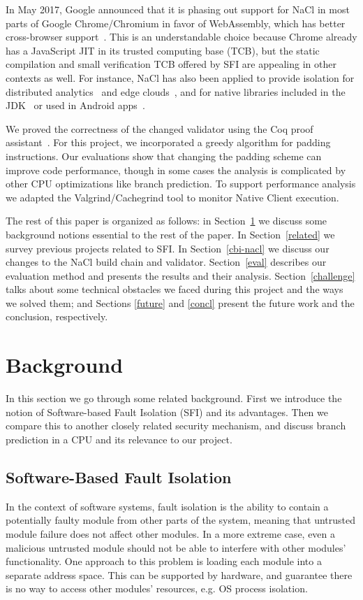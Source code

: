 \documentclass[conference]{IEEEtran}
\begin{document}
In May 2017, Google announced that it is phasing out support for NaCl
in most parts of Google Chrome/Chromium in favor of WebAssembly, which
has better cross-browser support~\cite{nelsonChromiumBlog}.
%
This is an understandable choice because Chrome already has a JavaScript
JIT in its trusted computing base (TCB), but the static compilation
and small verification TCB offered by SFI are appealing in other
contexts as well.
%
For instance, NaCl has also been applied to provide isolation for
distributed analytics~\cite{Rad2014} and edge
clouds~\cite{JonathanROCW2017}, and for native libraries included in
the JDK~\cite{SiefersTM2010} or used in Android
apps~\cite{AthanasopoulosK2016}.

We proved the correctness of the changed validator using the Coq proof assistant~\cite{Coq}. For this project, we incorporated a greedy algorithm for 
padding instructions. Our evaluations show that changing the  padding scheme can improve code performance, though in some cases the analysis is 
complicated by other CPU optimizations like branch prediction. To support performance analysis we adapted the Valgrind/Cachegrind tool to monitor Native Client execution.

The rest of this paper is organized as follows: in Section~\ref{background} we discuss some background notions essential to the rest of the paper. 
In Section~\ref{related} we survey previous projects related to  SFI. In Section~\ref{cbi-nacl} we discuss our changes to the NaCl build chain and validator. 
Section~\ref{eval} describes our evaluation method and presents the results and their analysis. Section~\ref{challenge} talks about some technical obstacles 
we faced during this project and the ways we solved them; and Sections \ref{future} and \ref{concl} present the future work and the conclusion, respectively.



\section{Background}
\label{background}
In this section we go through some related background. First we introduce the notion of Software-based Fault Isolation (SFI) and its advantages. Then we compare this  to another  closely related security mechanism, and discuss branch prediction in a CPU and its relevance to our project.
\subsection{Software-Based Fault Isolation}
In the context of software systems, fault isolation is the ability to contain a potentially faulty module from other parts of the system, meaning that untrusted module failure does not affect other modules. In a more extreme case, even a malicious untrusted module should not be able to interfere with other modules' functionality. One approach to this problem is loading each module into a separate address space. This can be supported  by hardware, and guarantee there is no way to access other modules' resources, e.g. OS process isolation.
\end{document}
